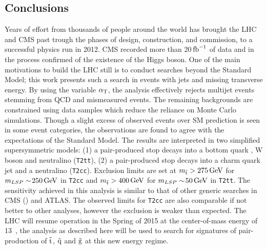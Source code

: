 \FloatBarrier
\subsection{Conclusions}


Years of effort from thousands of people around the world
has brought the LHC and CMS past trough the phases of design, construction,
and commission, to a successful physics run in 2012. CMS recorded more than 
20$\mbox{\ensuremath{\,\text{fb}^\text{$-$1}}}$ of data and in the process confirmed of the existence of the Higgs boson. 
One of the main motivations to build the LHC still is to conduct
searches beyond the Standard Model; this work presents such a search
in events with jets and missing transverse energy. By using the variable $\alpha_{\text{T}}$,
the analysis effectively rejects multijet events stemming from QCD and 
mismeasured events. The remaining backgrounds are constrained using
data samples which reduce the reliance on Monte Carlo simulations. Though
a slight excess of observed events over SM prediction is seen in some event categories, 
the observations are found to agree with the expectations of the Standard Model. 
The results are interpreted in two simplified supersymmetric models: (1) a 
pair-produced stop decays into a bottom quark , W boson and neutralino 
(\texttt{T2tt}), (2) a pair-produced stop decays into a charm quark 
jet and a neutralino (\texttt{T2cc}). 
Exclusion limits are set at $m_{\tilde{\rm t}}>275\,\text{Ge\hspace{-.08em}V}$ for $m_{LSP}\sim\!250\,\text{Ge\hspace{-.08em}V}$ 
in \texttt{T2cc} and $m_{\tilde{\rm t}}>400\,\text{Ge\hspace{-.08em}V}$ for $m_{LSP}\sim\!50\,\text{Ge\hspace{-.08em}V}$ in \texttt{T2tt}. 
The sensitivity achieved in this analysis is similar to that of other 
generic searches in CMS (\cite{CMS-PAS-SUS-14-008,cms-pas-sus-09001})
and ATLAS. The observed limits for \texttt{T2cc} are also comparable 
if not better to other analyses, however the  exclusion is 
weaker than expected. The LHC will resume operation in the Spring of 
2015 at the center-of-mass energy of 13~\TeV, the \alphat 
analysis as described here will be used to search for signatures of 
pair-production of $\tilde{\rm t}$, $\tilde{\rm q}$ and $\tilde{\rm g}$ at this new energy regime.
